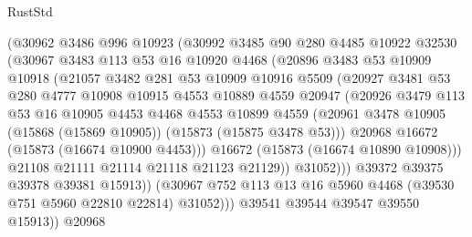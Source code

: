 \begin{lexlean}{RustStd}
\begin{coremodule}
                (@30962
                  @3486
                  @996
                  @10923
                  (@30992
                    @3485
                    @90
                    @280
                    @4485
                    @10922
                    @32530
                    (@30967
                      @3483
                      @113
                      @53
                      @16
                      @10920
                      @4468
                      (@20896
                        @3483
                        @53
                        @10909
                        @10918
                        (@21057
                          @3482
                          @281
                          @53
                          @10909
                          @10916
                          @5509
                          (@20927
                            @3481
                            @53
                            @280
                            @4777
                            @10908
                            @10915
                            @4553
                            @10889
                            @4559
                            @20947
                            (@20926
                              @3479
                              @113
                              @53
                              @16
                              @10905
                              @4453
                              @4468
                              @4553
                              @10899
                              @4559
                              (@20961
                                @3478
                                @10905
                                (@15868 (@15869 @10905))
                                (@15873 (@15875 @3478 @53)))
                              @20968
                              @16672
                              (@15873 (@16674 @10900 @4453)))
                            @16672
                            (@15873 (@16674 @10890 @10908)))
                          @21108
                          @21111
                          @21114
                          @21118
                          @21123
                          @21129))
                      @31052)))
                @39372
                @39375
                @39378
                @39381
                @15913))
            (@30967 @752 @113 @13 @16 @5960 @4468 (@39530 @751 @5960 @22810 @22814) @31052)))
        @39541
        @39544
        @39547
        @39550
        @15913))
    @20968

\end{coremodule}
\end{lexlean}
